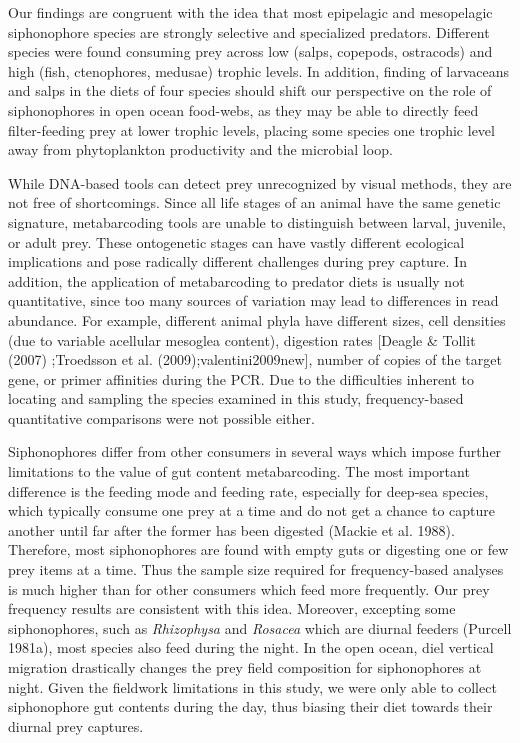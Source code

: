 \documentclass[12pt,]{article}
\begin{document}
Our findings are congruent with the idea that most epipelagic and mesopelagic siphonophore species are strongly selective and specialized predators. Different species were found consuming prey across low (salps, copepods, ostracods) and high (fish, ctenophores, medusae) trophic levels. In addition, finding of larvaceans and salps in the diets of four species should shift our perspective on the role of siphonophores in open ocean food-webs, as they may be able to directly feed filter-feeding prey at lower trophic levels, placing some species one trophic level away from phytoplankton productivity and the microbial loop.

While DNA-based tools can detect prey unrecognized by visual methods, they are not free of shortcomings. Since all life stages of an animal have the same genetic signature, metabarcoding tools are unable to distinguish between larval, juvenile, or adult prey. These ontogenetic stages can have vastly different ecological implications and pose radically different challenges during prey capture. In addition, the application of metabarcoding to predator diets is usually not quantitative, since too many sources of variation may lead to differences in read abundance. For example, different animal phyla have different sizes, cell densities (due to variable acellular mesoglea content), digestion rates {[}Deagle \& Tollit (2007) ;Troedsson et al. (2009);valentini2009new{]}, number of copies of the target gene, or primer affinities during the PCR. Due to the difficulties inherent to locating and sampling the species examined in this study, frequency-based quantitative comparisons were not possible either.

Siphonophores differ from other consumers in several ways which impose further limitations to the value of gut content metabarcoding. The most important difference is the feeding mode and feeding rate, especially for deep-sea species, which typically consume one prey at a time and do not get a chance to capture another until far after the former has been digested (Mackie et al. 1988). Therefore, most siphonophores are found with empty guts or digesting one or few prey items at a time. Thus the sample size required for frequency-based analyses is much higher than for other consumers which feed more frequently. Our prey frequency results are consistent with this idea. Moreover, excepting some siphonophores, such as \emph{Rhizophysa} and \emph{Rosacea} which are diurnal feeders (Purcell 1981a), most species also feed during the night. In the open ocean, diel vertical migration drastically changes the prey field composition for siphonophores at night. Given the fieldwork limitations in this study, we were only able to collect siphonophore gut contents during the day, thus biasing their diet towards their diurnal prey captures.
\end{document}

